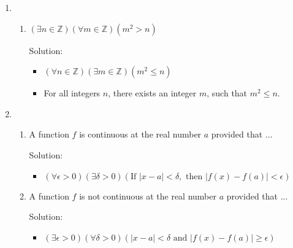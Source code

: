 \documentclass[12pt]{article}
\theoremstyle{definition}
\newcommand{\solution}{\textcolor{PineGreen}{Solution:\newline}}
\begin{document}
\begin{enumerate}[leftmargin=*]
\begin{enumerate}
        \solution
        \begin{itemize}
            \item In English, this statement says, "For all integers \(x\), if \(x^2\) is odd, then \(x\) is odd."
            \item The negation is \((\exists x \in \mathbb{Z})(x^2 \text{ is odd and } x \text{ is even})\).
            \item In English, the negation says, "There exists an integer \(x\), such that \(x^2\) is odd and \(x\) is even."
        \end{itemize}
    \end{enumerate}

\setcounter{enumi}{3}
\item 
    \begin{enumerate}[label=(e)]
        \item \((\exists n \in \mathbb{Z})(\forall m \in \mathbb{Z})(m^2 > n)\)
        
        \solution
        \begin{itemize}
            \item \((\forall n \in \mathbb{Z})(\exists m \in \mathbb{Z})(m^2 \leq n)\)
            \item For all integers \(n\), there exists an integer \(m\), such that \(m^2 \leq n\).
        \end{itemize}
    \end{enumerate}

\newpage

\setcounter{enumi}{10}
\item 
    \begin{enumerate}[label=(\alph*)]
        \item A function \(f\) is continuous at the real number \(a\) provided that ...
        
        \solution
        \begin{itemize}
            \item \((\forall \epsilon > 0)(\exists \delta > 0)(\text{If } |x - a| < \delta, \text{ then } |f(x) - f(a)| < \epsilon)\)

        \end{itemize}
        
        \item A function \(f\) is not continuous at the real number \(a\) provided that ...
        
        \solution
        \begin{itemize}
            \item \((\exists \epsilon > 0)(\forall \delta > 0)(|x - a| < \delta \text{ and } |f(x) - f(a)| \geq \epsilon)\)
        \end{itemize}
        

\end{enumerate}
\end{enumerate}
\end{document}
